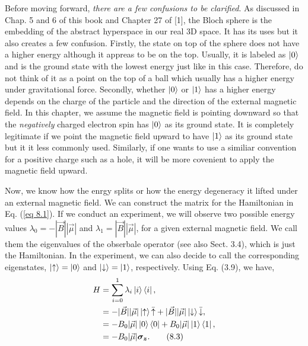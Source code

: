 \documentclass{article}
\begin{document}
Before moving forward, \textit{there are a few confusions to be clarified}.
As discussed in Chap. 5 and 6 of this book and Chapter 27 of [1], the Bloch sphere
is the embedding of the abstract hyperspace in our real 3D space.
It has its uses but it also creates a few confusion. Firstly, the state on top of
the sphere does not have a higher energy although it appreas to be on the top.
Usually, it is labeled as $\ket{0}$ and is the ground state with the lowest
energy just like in this case. Therefore, do not think of it as a point on the top
of a ball which usually has a higher energy under gravitational force. Secondly, whether 
$\ket{0}$ or $\ket{1}$ has a higher energy depends on the charge of the particle
and the direction of the external magnetic field. In this chapter,
we assume the magnetic field is pointing downward so that the \textit{negatively}
charged electron spin has $\ket{0}$ as its ground state. It is completely legitimate 
if we point the magnetic field upward to have $\ket{1}$ as its ground state but it it
less commonly used. Similarly, if one wants to use a similiar convention for a positive charge
such as a hole, it will be more covenient to apply the magnetic field upward.

Now, we know how the enrgy splits or how the energy degeneracy it lifted under
an external magnetic field. We can construct the matrix for the Hamiltonian in Eq.
(\ref{eq 8.1}). If we conduct an experiment, we will observe two possible energy
values $\lambda_0=-|\vec{B}||\vec{\mu}|$ and $\lambda_1=|\vec{B}||\vec{\mu}|$, for a given
external magnetic field. We call them the eigenvalues of the obserbale operator (see also
 Sect. 3.4), which is just the Hamiltonian. In the experiment, we can also decide to call the corresponding eigenstates,
 $\ket{\uparrow}=\ket{0}$ and $\ket{\downarrow}=\ket{1}$, respectively. Using Eq. (3.9), we have,
 \begin{align*}\label{eq 8.3}
    H&=\sum_{i=0}^{1}\lambda_i\ket{i}\bra{i},\\
    &=-|\vec{B}||\vec{\mu}|\ket{\uparrow}\bar{\uparrow}+|\vec{B}||\vec{\mu}|\ket{\downarrow}\bar{\downarrow},\\
    &=-B_0|\vec{\mu}|\ket{0}\bra{0}+B_0|\vec{\mu}|\ket{1}\bra{1},\\
    &=-B_0|\vec{\mu}|\boldsymbol{\sigma_z}.\tag{8.3}
\end{align*}
\end{document}
